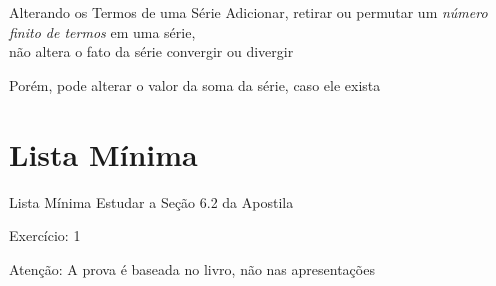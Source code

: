 \documentclass[fleqn,utf8,aspectratio=169,12pt]{beamer}
\begin{document}
\begin{frame}{Alterando os Termos de uma Série}
  Adicionar, retirar ou permutar um \emph{número finito de termos} em uma série,\\
  não altera o fato da série convergir ou divergir

  \pause
  \vspace{\baselineskip}
  Porém, pode alterar o valor da soma da série, caso ele exista
\end{frame}

\section{Lista Mínima}

\begin{frame}{Lista Mínima}
  Estudar a Seção 6.2 da Apostila

  \vspace{\baselineskip}
  Exercício: 1

  \vfill
  Atenção: A prova é baseada no livro, não nas apresentações
\end{frame}

\end{document}
